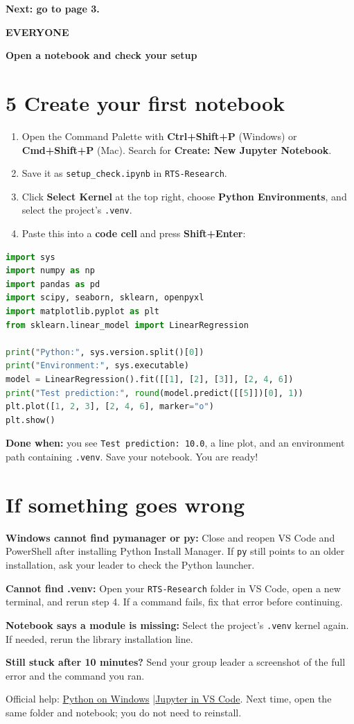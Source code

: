 \documentclass[11pt,letterpaper]{article}
\newcommand{\heading}[2]{{\small\color{accent}\textbf{#1}}\par{\LARGE\bfseries #2}\par}
\begin{document}
\textbf{Next: go to page 3.}

\newpage
\heading{EVERYONE}{Open a notebook and check your setup}
\section*{5 \quad Create your first notebook}
\begin{enumerate}
\item Open the Command Palette with \textbf{Ctrl+Shift+P} (Windows) or
\textbf{Cmd+Shift+P} (Mac). Search for \textbf{Create: New Jupyter Notebook}.
\item Save it as \texttt{setup\_check.ipynb} in \texttt{RTS-Research}.
\item Click \textbf{Select Kernel} at the top right, choose
\textbf{Python Environments}, and select the project's \texttt{.venv}.
\item Paste this into a \textbf{code cell} and press \textbf{Shift+Enter}:
\end{enumerate}
\begin{lstlisting}[language=Python]
import sys
import numpy as np
import pandas as pd
import scipy, seaborn, sklearn, openpyxl
import matplotlib.pyplot as plt
from sklearn.linear_model import LinearRegression

print("Python:", sys.version.split()[0])
print("Environment:", sys.executable)
model = LinearRegression().fit([[1], [2], [3]], [2, 4, 6])
print("Test prediction:", round(model.predict([[5]])[0], 1))
plt.plot([1, 2, 3], [2, 4, 6], marker="o")
plt.show()
\end{lstlisting}
\textbf{Done when:} you see \texttt{Test prediction: 10.0}, a line plot, and an
environment path containing \texttt{.venv}. Save your notebook. You are ready!

\section*{If something goes wrong}
\textbf{Windows cannot find pymanager or py:} Close and reopen VS Code and
PowerShell after installing Python Install Manager. If \texttt{py} still
points to an older installation, ask your leader to check the Python launcher.

\textbf{Cannot find .venv:} Open your \texttt{RTS-Research} folder in VS Code,
open a new terminal, and rerun step 4. If a command fails, fix that error
before continuing.

\textbf{Notebook says a module is missing:} Select the project's
\texttt{.venv} kernel again. If needed, rerun the library installation line.

\textbf{Still stuck after 10 minutes?} Send your group leader a screenshot
of the full error and the command you ran.

{\footnotesize Official help:
\href{https://docs.python.org/3/using/windows.html}{Python on Windows}
\quad|\quad \href{https://code.visualstudio.com/docs/datascience/jupyter-notebooks}{Jupyter in VS Code}.
Next time, open the same folder and notebook; you do not need to reinstall.}
\end{document}
